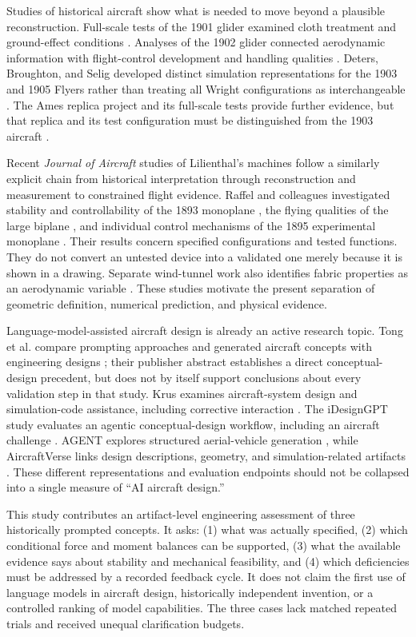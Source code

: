\documentclass[10pt,letterpaper]{article}
\begin{document}
Studies of historical aircraft show what is needed to move beyond a plausible reconstruction. Full-scale tests of the 1901 glider examined cloth treatment and ground-effect conditions \cite{ref8}. Analyses of the 1902 glider connected aerodynamic information with flight-control development and handling qualities \cite{ref7,ref9}. Deters, Broughton, and Selig developed distinct simulation representations for the 1903 and 1905 Flyers rather than treating all Wright configurations as interchangeable \cite{ref11}. The Ames replica project and its full-scale tests provide further evidence, but that replica and its test configuration must be distinguished from the 1903 aircraft \cite{ref12,ref13}.

Recent \emph{Journal of Aircraft} studies of Lilienthal's machines follow a similarly explicit chain from historical interpretation through reconstruction and measurement to constrained flight evidence. Raffel and colleagues investigated stability and controllability of the 1893 monoplane \cite{ref16}, the flying qualities of the large biplane \cite{ref17}, and individual control mechanisms of the 1895 experimental monoplane \cite{ref18}. Their results concern specified configurations and tested functions. They do not convert an untested device into a validated one merely because it is shown in a drawing. Separate wind-tunnel work also identifies fabric properties as an aerodynamic variable \cite{ref19}. These studies motivate the present separation of geometric definition, numerical prediction, and physical evidence.

Language-model-assisted aircraft design is already an active research topic. Tong et al. compare prompting approaches and generated aircraft concepts with engineering designs \cite{ref25}; their publisher abstract establishes a direct conceptual-design precedent, but does not by itself support conclusions about every validation step in that study. Krus examines aircraft-system design and simulation-code assistance, including corrective interaction \cite{ref26}. The iDesignGPT study evaluates an agentic conceptual-design workflow, including an aircraft challenge \cite{ref27}. AGENT explores structured aerial-vehicle generation \cite{ref28}, while AircraftVerse links design descriptions, geometry, and simulation-related artifacts \cite{ref29}. These different representations and evaluation endpoints should not be collapsed into a single measure of ``AI aircraft design.''

This study contributes an artifact-level engineering assessment of three historically prompted concepts. It asks: (1) what was actually specified, (2) which conditional force and moment balances can be supported, (3) what the available evidence says about stability and mechanical feasibility, and (4) which deficiencies must be addressed by a recorded feedback cycle. It does not claim the first use of language models in aircraft design, historically independent invention, or a controlled ranking of model capabilities. The three cases lack matched repeated trials and received unequal clarification budgets.
\end{document}
